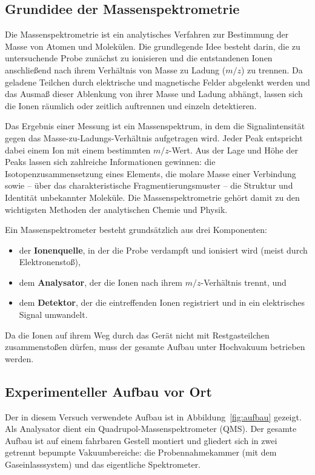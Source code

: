\documentclass{article}
\begin{document}
\subsection{Grundidee der Massenspektrometrie}

Die Massenspektrometrie ist ein analytisches Verfahren zur Bestimmung
der Masse von Atomen und Molekülen. Die grundlegende Idee besteht darin,
die zu untersuchende Probe zunächst zu ionisieren und die entstandenen
Ionen anschließend nach ihrem Verhältnis von Masse zu Ladung ($m/z$)
zu trennen. Da geladene Teilchen durch elektrische und magnetische
Felder abgelenkt werden und das Ausmaß dieser Ablenkung von ihrer Masse
und Ladung abhängt, lassen sich die Ionen räumlich oder zeitlich
auftrennen und einzeln detektieren.

Das Ergebnis einer Messung ist ein Massenspektrum, in dem die
Signalintensität gegen das Masse-zu-Ladungs-Verhältnis aufgetragen
wird. Jeder Peak entspricht dabei einem Ion mit einem bestimmten
$m/z$-Wert. Aus der Lage und Höhe der Peaks lassen sich zahlreiche
Informationen gewinnen: die Isotopenzusammensetzung eines Elements, die
molare Masse einer Verbindung sowie -- über das charakteristische
Fragmentierungsmuster -- die Struktur und Identität unbekannter
Moleküle. Die Massenspektrometrie gehört damit zu den wichtigsten
Methoden der analytischen Chemie und Physik.

Ein Massenspektrometer besteht grundsätzlich aus drei Komponenten:
\begin{itemize}
    \item der \textbf{Ionenquelle}, in der die Probe verdampft und
        ionisiert wird (meist durch Elektronenstoß),
    \item dem \textbf{Analysator}, der die Ionen nach ihrem
        $m/z$-Verhältnis trennt, und
    \item dem \textbf{Detektor}, der die eintreffenden Ionen registriert
        und in ein elektrisches Signal umwandelt.
\end{itemize}
Da die Ionen auf ihrem Weg durch das Gerät nicht mit Restgasteilchen
zusammenstoßen dürfen, muss der gesamte Aufbau unter Hochvakuum
betrieben werden.

\subsection{Experimenteller Aufbau vor Ort}

Der in diesem Versuch verwendete Aufbau ist in Abbildung~\ref{fig:aufbau}
gezeigt. Als Analysator dient ein Quadrupol-Massenspektrometer (QMS).
Der gesamte Aufbau ist auf einem fahrbaren Gestell montiert und gliedert
sich in zwei getrennt bepumpte Vakuumbereiche: die Probennahmekammer
(mit dem Gaseinlasssystem) und das eigentliche Spektrometer.
\end{document}
